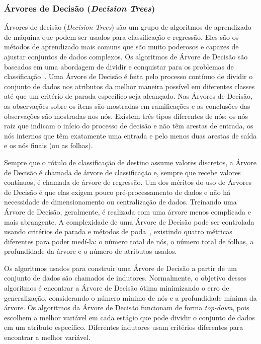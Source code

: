 \documentclass[portugues]{ic-tese}
\begin{document}
\subsubsection{Árvores de Decisão (\textit{Decision Trees})}

Árvores de decisão (\textit{Decision Trees}) são um grupo de algoritmos de aprendizado de máquina que podem ser usados para classificação e regressão. Eles são os métodos de aprendizado mais comuns que são muito poderosos e capazes de ajustar conjuntos de dados complexos. Os algoritmos de Árvore de Decisão são baseados em uma abordagem de dividir e conquistar para os problemas de classificação~\citep{Witten_2016}. Uma Árvore de Decisão é feita pelo processo contínuo de dividir o conjunto de dados nos atributos da melhor maneira possível em diferentes classes até que um critério de parada específico seja alcançado. Nas Árvores de Decisão, as observações sobre os itens são mostradas em ramificações e as conclusões das observações são mostradas nos nós. Existem três tipos diferentes de nós: os nós raiz que indicam o início do processo de decisão e não têm arestas de entrada, os nós internos que têm exatamente uma entrada e pelo menos duas arestas de saída e os nós finais (ou as folhas).

Sempre que o rótulo de classificação de destino assume valores discretos, a Árvore de Decisão é chamada de árvore de classificação e, sempre que recebe valores contínuos, é chamada de árvore de regressão. Um dos méritos do uso de Árvores de Decisão é que elas exigem pouco pré-processamento de dados e não há necessidade de dimensionamento ou centralização de dados. Treinando uma Árvore de Decisão, geralmente, é realizada com uma árvore menos complicada e mais abrangente. A complexidade de uma Árvore de Decisão pode ser controlada usando critérios de parada e métodos de poda~\citep{Rokach_2005}, existindo quatro métricas diferentes para poder medí-la: o número total de nós, o número total de folhas, a profundidade da árvore e o número de atributos usados.

Os algoritmos usados para construir uma Árvore de Decisão a partir de um conjunto de dados são chamados de indutores. Normalmente, o objetivo desses algoritmos é encontrar a Árvore de Decisão ótima minimizando o erro de generalização, considerando o número mínimo de nós e a profundidade mínima da árvore. Os algoritmos da Árvore de Decisão funcionam de forma \textit{top-down}, pois escolhem a melhor variável em cada estágio que pode dividir o conjunto de dados em um atributo específico. Diferentes indutores usam critérios diferentes para encontrar a melhor variável.
\end{document}
